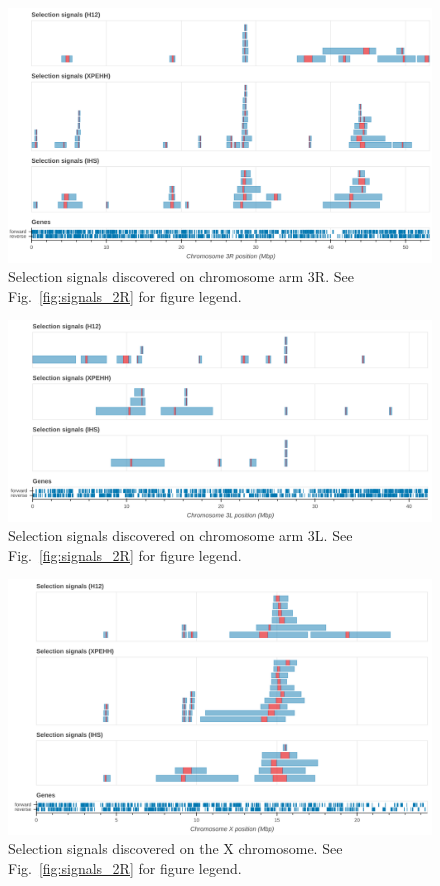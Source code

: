\documentclass[a4paper,11pt,abstracton,hidelinks]{scrartcl}
\begin{document}
\clearpage
\begin{figure}[h!]
\centering
\includegraphics[width=1.1\textwidth,center]{artwork/chapter5/signals_3R.png}
\caption{Selection signals discovered on chromosome arm 3R.
%
See Fig.~\ref{fig:signals_2R} for figure legend.
}
\label{fig:signals_3R}
\end{figure}


\clearpage
\begin{figure}[h!]
\centering
\includegraphics[width=1.1\textwidth,center]{artwork/chapter5/signals_3L.png}
\caption{Selection signals discovered on chromosome arm 3L.
%
See Fig.~\ref{fig:signals_2R} for figure legend.
}
\label{fig:signals_3L}
\end{figure}


\clearpage
\begin{figure}[h!]
\centering
\includegraphics[width=1.1\textwidth,center]{artwork/chapter5/signals_X.png}
\caption{Selection signals discovered on the X chromosome.
%
See Fig.~\ref{fig:signals_2R} for figure legend.
}
\label{fig:signals_X}
\end{figure}
\end{document}
